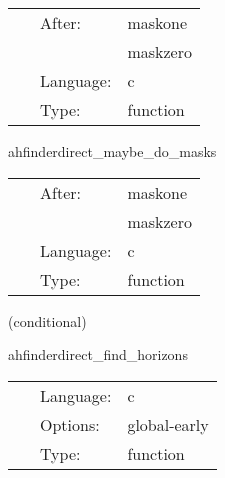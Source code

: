 \hspace{5mm}{\it set mask(s) based on apparent horizon position(s) } 


\hspace{5mm}

 \begin{tabular*}{160mm}{cll} 
~ & After:  & maskone \\ 
~& ~ &maskzero\\ 
~ & Language:  & c \\ 
~ & Type:  & function \\ 
\end{tabular*} 


\vspace{5mm}


\hspace{5mm} ahfinderdirect\_maybe\_do\_masks 

\hspace{5mm}{\it set mask(s) based on apparent horizon position(s) } 


\hspace{5mm}

 \begin{tabular*}{160mm}{cll} 
~ & After:  & maskone \\ 
~& ~ &maskzero\\ 
~ & Language:  & c \\ 
~ & Type:  & function \\ 
\end{tabular*} 


\vspace{5mm}

   (conditional) 

\hspace{5mm} ahfinderdirect\_find\_horizons 

\hspace{5mm}{\it find apparent horizon(s) after this time step } 


\hspace{5mm}

 \begin{tabular*}{160mm}{cll} 
~ & Language:  & c \\ 
~ & Options:  & global-early \\ 
~ & Type:  & function \\ 
\end{tabular*} 


\vspace{5mm}

